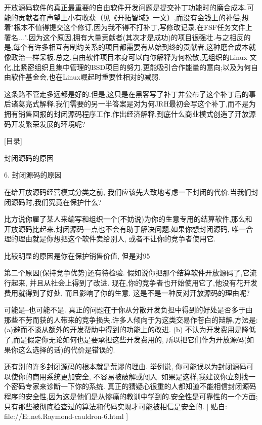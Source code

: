 \documentclass[a4paper,12pt,UTF8,twoside]{ctexbook}
\begin{document}
开放源码软件的真正最重要的自由软件开发问题是提交补丁功能时的磨合成本.可能的贡献者在声望上小有收获（见《开拓智域》一文）,而没有金钱上的补偿,想着"根本不值得提交这个修订,因为我不得不打补丁,写修改记录,在FSF任务文件上署名...".因为这个原因,拥有大量贡献者(其次才是成功)的项目很强壮.与之相反的是,每个有许多相互有制约关系的项目都需要有从始到终的贡献者.这种磨合成本就像政治一样呆板.总之,自由软件项目本身可以向你解释为何松散,无组织的Linux 文化,比紧密组织且集中管理的BSD项目的努力,更能吸引合作能量的意向;以及为何自由软件基金会,也在Linux崛起时重要性相对的减弱.


这条路不管走多远都是好的.但是,这只是在黑客写了补丁并公布了这个补丁后的事后诸葛亮式解释.我们需要的另一半答案是对为何JRH最初会写这个补丁,而不是为拥有销售回报的封闭源码程序工作.作出经济解释.到底什么商业模式创造了开放源码开发繁荣发展的环境呢?

[目录]

封闭源码的原因

6. 封闭源码的原因

在给开放源码经营模式分类之前, 我们应该先大致地考虑一下封闭的代价.当我们封闭源码时,我们究竟在保护什么?


比方说你雇了某人来编写和组织一个(不妨说)为你的生意专用的结算软件,那么和开放源码比起来,封闭源码一点也不会有助于解决问题.如果你想封闭源码, 唯一合理的理由就是你想把这个软件卖给别人, 或者不让你的竞争者使用它.


比较明显的原因是你在保护销售价值, 但是对95%


第二个原因(保持竞争优势)还有待检验. 假如说你把那个结算软件开放源码了,它流行起来, 并且从社会上得到了改进. 现在,你的竞争者也开始使用它了,他没有花开发费用就得到了好处, 而且影响了你的生意. 这是不是一种反对开放源码的理由呢?


可能是--也可能不是. 真正的问题在于你从分散开发负担中得到的好处是否多于由那些不劳而获的人带来的竞争损失.许多人倾向于为这类交易作苍白的辩解,方法是: (a)避而不谈从额外的开发帮助中得到的功能上的改进. (b) 不认为开发费用是降低了,而是假定你无论如何也是要承担这些开发费用的, 所以把它们作为开放源码(如果你这么选择的话)的代价是错误的.


还有别的许多封闭源码的根本就是荒谬的理由. 举例说, 你可能误以为封闭源码可以使你的商用系统更加安全, 不容易被破解或闯入. 如果是这样,我建议你立刻找一个密码专家来诊断一下你的系统. 真正的猜疑心很重的人都知道不能相信封闭源码程序的安全性,因为这是他们是从惨痛的教训中学到的.安全性是可靠性的一个方面; 只有那些被彻底检查过的算法和代码实现才可能被相信是安全的.
[ 贴自: file://E:\joyfire\joyfire.net\bible\Eric.Raymond\magic-cauldron-6.html ]
\end{document}
